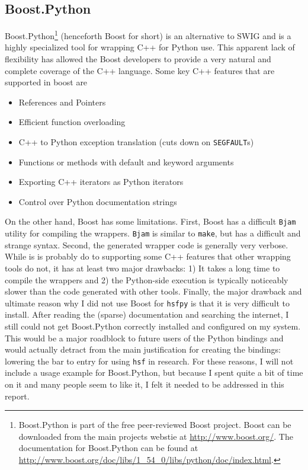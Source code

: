 \subsection{Boost.Python} \label{sub:boost_python}
  Boost.Python\footnote{Boost.Python is part of the free peer-reviewed Boost project. Boost can be downloaded from the main projects webstie at \url{http://www.boost.org/}. The documentation for Boost.Python can be found at \url{http://www.boost.org/doc/libs/1_54_0/libs/python/doc/index.html}.} (henceforth Boost for short) is an alternative to SWIG and is a highly specialized tool for wrapping C++ for Python use. This apparent lack of flexibility has allowed the Boost developers to provide a very natural and complete coverage of the C++ language. Some key C++ features that are supported in boost are

  \begin{itemize}
    \itemsep -.2in
    \item References and Pointers
    \item Efficient function overloading
    \item C++ to Python exception translation (cuts down on \texttt{SEGFAULT}s)
    \item Functions or methods with default and keyword arguments
    \item Exporting C++ iterators as Python iterators
    \item Control over Python documentation strings
  \end{itemize}

  On the other hand, Boost has some limitations. First, Boost has a difficult \texttt{Bjam} utility for compiling the wrappers. \texttt{Bjam} is similar to \texttt{make}, but has a difficult and strange syntax. Second, the generated wrapper code is generally very verbose. While is is probably do to supporting some C++ features that other wrapping tools do not, it has at least two major drawbacks: 1) It takes a long time to compile the wrappers and 2) the Python-side execution is typically noticeably slower than the code generated with other tools. Finally, the major drawback and ultimate reason why I did not use Boost for \texttt{hsfpy} is that it is very difficult to install. After reading the (sparse) documentation and searching the internet, I still could not get Boost.Python correctly installed and configured on my system. This would be a major roadblock to future users of the Python bindings and would actually detract from the main justification for creating the bindings: lowering the bar to entry for using \texttt{hsf} in research. For these reasons, I will not include a usage example for Boost.Python, but because I spent quite a bit of time on it and many people seem to like it, I felt it needed to be addressed in this report.

